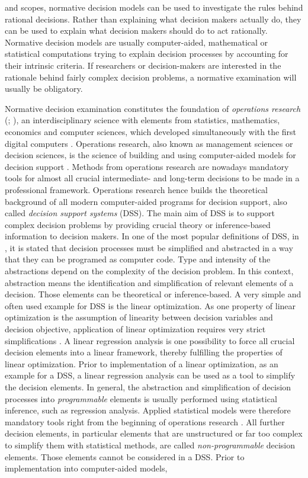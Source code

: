 and scopes, normative decision models can be used to investigate the rules behind rational decisions. Rather than explaining what decision makers actually do, they can be used to explain what decision makers should do to act rationally. Normative decision models are usually computer-aided, mathematical or statistical computations trying to explain decision processes by accounting for their intrinsic criteria. If researchers or decision-makers are interested in the rationale behind fairly complex decision problems, a normative examination will usually be obligatory.

Normative decision examination constitutes the foundation of \textit{operations research} (\citealp[p. 112]{shim_2002}; \citealp[p. 498]{simon_1979}), an interdisciplinary science with elements from statistics, mathematics, economics and computer sciences, which developed simultaneously with the first digital computers \citep{churchman_1957}. Operations research, also known as management sciences or decision sciences, is the science of building and using computer-aided models for decision support \citep[p. 373-374]{wacker_1998}. Methods from operations research are nowadays mandatory tools for almost all crucial intermediate- and long-term decisions to be made in a professional framework. Operations research hence builds the theoretical background of all modern computer-aided programs for decision support, also called \textit{decision support systems} (DSS). The main aim of DSS is to support complex decision problems by providing crucial theory or inference-based information to decision makers. In one of the most popular definitions of DSS, in \citet[p. 26]{gorry_1971}, it is stated that decision processes must be simplified and abstracted in a way that they can be programed as computer code. Type and intensity of the abstractions depend on the complexity of the decision problem. In this context, abstraction means the identification and simplification of relevant elements of a decision. Those elements can be theoretical or inference-based. A very simple and often used example for DSS is the linear optimization. As one property of linear optimization is the assumption of linearity between decision variables and decision objective, application of linear optimization requires very strict simplifications \citep[p. 129]{kangas_2015}. A linear regression analysis is one possibility to force all crucial decision elements into a linear framework, thereby fulfilling the properties of linear optimization. Prior to implementation of a linear optimization, as an example for a DSS, a linear regression analysis can be used as a tool to simplify the decision elements. In general, the abstraction and simplification of decision processes into \textit{programmable} elements is usually performed using statistical inference, such as regression analysis. Applied statistical models were therefore mandatory tools right from the beginning of operations research \citep{churchman_1957}. All further decision elements, in particular elements that are unstructured or far too complex to simplify them with statistical methods, are called \textit{non-programmable} decision elements. Those elements cannot be considered in a DSS. Prior to implementation into computer-aided models, 